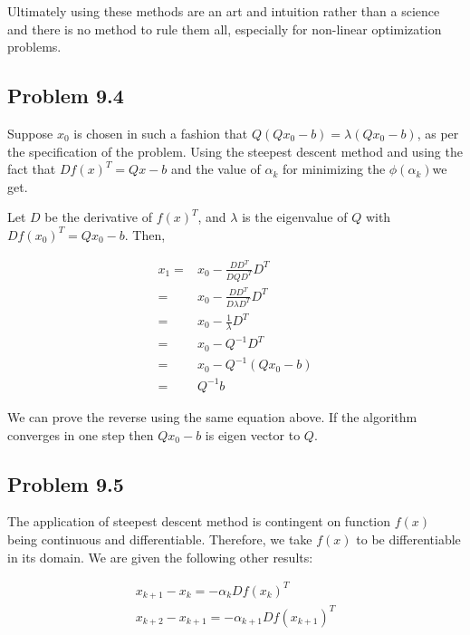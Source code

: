 \documentclass[letterpaper,12pt]{article}
\theoremstyle{definition}
\begin{document}
\begin{flushleft}
Ultimately using these methods are an art and intuition rather than a science and there is no method to rule them all, especially for non-linear optimization problems.
\end{flushleft}




\subsection*{Problem 9.4}
\begin{flushleft}
Suppose $x_0$ is chosen in such a fashion that $Q(Qx_0-b) = \lambda (Qx_0-b)$, as per the specification of the problem. Using the steepest descent method and using the fact that $Df(x)^T =  Qx-b$ and the value of $\alpha_k$ for minimizing the $\phi(\alpha_k)$we get.

\vspace{3mm}
Let $D$ be the derivative of $f(x)^T$, and $\lambda$ is the eigenvalue of $Q$ with $Df(x_0)^T = Q x_0 - b$. Then,
\end{flushleft}

\begin{align*}
  x_1 =& x_0 - \frac{D  D^T}{DQD^T} D^T \\
      =& x_0 - \frac{D D^T}{D \lambda D^T} D^T \\
      =& x_0 - \frac{1}{\lambda} D^T \\
      =& x_0 - Q^{-1} D^T \\
      =& x_0 - Q^{-1} (Q x_0 -b) \\
      =& Q^{-1}b
\end{align*}

We can prove the reverse using the same equation above. If the algorithm converges in one step then $Qx_0- b$ is eigen vector to $Q$.
\subsection*{Problem 9.5}
The application of steepest descent method is contingent on function $f(x)$ being continuous and differentiable. Therefore, we take $f(x)$ to be differentiable in its domain. We are given the following other results:

\begin{align*}
   x_{k+1} -x_k=  -\alpha_kDf(x_k)^T\\
   x_{k+2} -x_{k+1}=  -\alpha_{k+1}Df(x_{k+1})^T
\end{align*}
\end{document}

